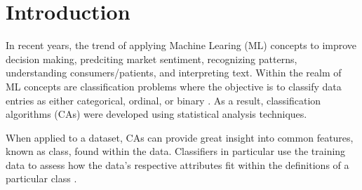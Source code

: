 \section{Introduction}
\label{sec:Introduction}

In recent years, the trend of applying Machine Learing (ML) concepts to improve decision making, predciting 
market sentiment, recognizing patterns, understanding consumers/patients, and interpreting text. 
Within the realm of ML concepts are classification problems where the objective is to classify data entries 
as either categorical, ordinal, or binary \cite{textbook}. 
As a result, classification algorithms (CAs) were developed using statistical analysis techniques. 

When applied to a dataset, CAs can provide great insight into common features, known as class,
found within the data. Classifiers in particular use the training data to assess how the data's respective 
attributes fit within the definitions of a particular class \cite{class}. 

